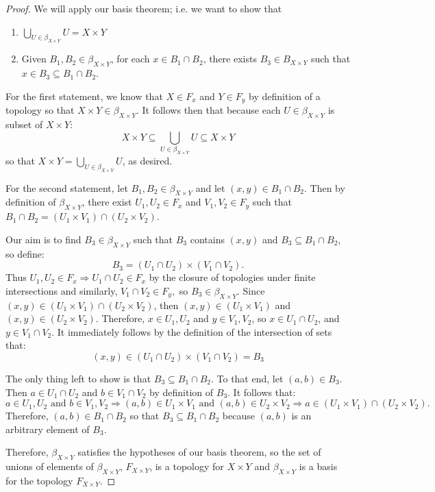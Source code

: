 \begin{proof}
We will apply our basis theorem; i.e. we want to show that
\begin{enumerate}
\item $\bigcup_{U\in \beta_{X\times Y}} U = X \times Y$
\item Given $B_1,B_2\in\beta_{X\times Y}$, for each $x\in B_1\cap B_2$, there exists $B_3\in B_{X\times Y}$ such that $x\in B_3\subseteq B_1\cap B_2$.
\end{enumerate}

For the first statement, we know that $X\in F_x$ and $Y\in F_y$ by definition of a topology so that $X\times Y\in \beta_{X\times Y}$. It follows then that because each $U\in \beta_{X\times Y}$ is  subset of $X\times Y$:
\[X \times Y \subseteq \bigcup_{U\in \beta_{X\times Y}} U \subseteq X\times Y\]
so that $X\times Y = \bigcup_{U\in \beta_{X\times Y}} U$, as desired.

For the second statement, let $B_1,B_2\in \beta_{X\times Y}$ and let $(x,y)\in B_1\cap B_2$. Then by definition of $\beta_{X\times Y}$, there exist $U_1,U_2\in F_x$ and $V_1,V_2\in F_y$ such that $B_1\cap B_2 = (U_1\times V_1)\cap (U_2\times V_2)$. 

Our aim is to find $B_3\in \beta_{X\times Y}$ such that $B_3$ contains $(x,y)$ and $B_3\subseteq B_1\cap B_2$, so define:
\[B_3 = (U_1\cap U_2) \times (V_1\cap V_2).\]
Thus $U_1,U_2\in F_x\Rightarrow U_1\cap U_2\in F_x$ by the closure of topologies under finite intersections and similarly, $V_1\cap V_2\in F_y,$ so $B_3\in \beta_{X\times Y}$.
Since $(x,y)\in (U_1 \times V_1)\cap (U_2\times V_2)$, then $(x,y)\in (U_1\times V_1)$ and $(x,y)\in (U_2\times V_2)$. Therefore, $x\in U_1,U_2$ and $y\in V_1,V_2$, so $x\in U_1\cap U_2$, and $y\in V_1\cap V_2$. It immediately follows by the definition of the intersection of sets that:
\[(x,y) \in (U_1\cap U_2)\times (V_1\cap V_2) = B_3\]

The only thing left to show is that $B_3\subseteq B_1\cap B_2$. To that end, let $(a,b)\in B_3$. Then $a\in U_1\cap U_2$ and $b\in V_1\cap V_2$ by definition of $B_3$. It follows that:
\[a\in U_1,U_2 \text{ and } b\in V_1,V_2 \Rightarrow (a,b)\in U_1\times V_1 \text{ and } (a,b)\in U_2 \times V_2 \Rightarrow a\in (U_1\times V_1)\cap (U_2\times V_2).\]
Therefore, $(a,b)\in B_1\cap B_2$ so that $B_3\subseteq B_1\cap B_2$ because $(a,b)$ is an arbitrary element of $B_3$. 

Therefore, $\beta_{X\times Y}$ satisfies the hypotheses of our basis theorem, so the set of unions of elements of $\beta_{X\times Y}$, $F_{X\times Y}$, is a topology for $X\times Y$ and $\beta_{X\times Y}$ is a basis for the topology $F_{X\times Y}$.
\end{proof}

